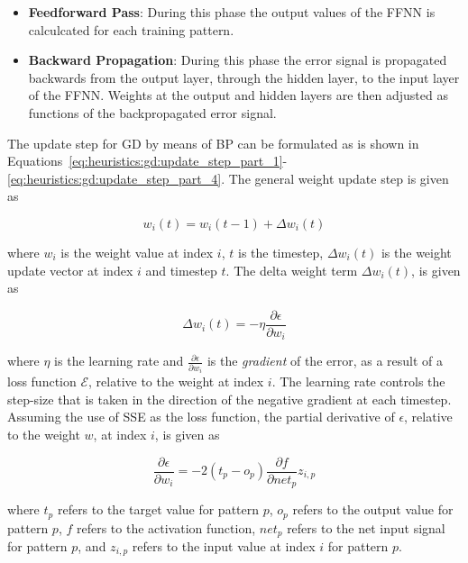 \begin{itemize}
      \item \textbf{Feedforward Pass}: During this phase the output values of the \acs{FFNN} is calculcated for each training pattern.

      \item \textbf{Backward Propagation}: During this phase the error signal is propagated backwards from the output layer, through the hidden layer, to the input layer of the \acs{FFNN}. Weights at the output and hidden layers are then adjusted as functions of the backpropagated error signal.
\end{itemize}

The update step for \acs{GD} by means of \acs{BP} can be formulated as is shown in Equations~\eqref{eq:heuristics:gd:update_step_part_1}-\eqref{eq:heuristics:gd:update_step_part_4}. The general weight update step is given as

\begin{equation}
      \label{eq:heuristics:gd:update_step_part_1}
      w_{i}(t) = w_{i}(t-1) + \Delta w_{i}(t)
\end{equation}

where $w_{i}$ is the weight value at index $i$, $t$ is the timestep, $\Delta w_{i}(t)$ is the weight update vector at index $i$ and timestep $t$. The delta weight term $\Delta w_{i}(t)$, is given as

\begin{equation}
      \label{eq:heuristics:gd:update_step_part_2}
      \Delta w_{i}(t) = -\eta\frac{\partial \epsilon}{\partial w_{i}}
\end{equation}

where $\eta$ is the learning rate and $\frac{\partial \epsilon}{\partial w_{i}}$ is the \textit{gradient} of the error, as a result of a loss function $\mathcal{E}$, relative to the weight at index $i$. The learning rate controls the step-size that is taken in the direction of the negative gradient at each timestep. Assuming the use of \acs{SSE} as the loss function, the partial derivative of $\epsilon$, relative to the weight $w$, at index $i$, is given as

\begin{equation}
      \label{eq:heuristics:gd:update_step_part_3}
      \frac{\partial \epsilon}{\partial w_{i}} = -2(t_{p} - o_{p})\frac{\partial f}{\partial net_{p}}z_{i,p}
\end{equation}

where $t_{p}$ refers to the target value for pattern $p$, $o_{p}$ refers to the output value for pattern $p$, $f$ refers to the activation function, $net_{p}$ refers to the net input signal for pattern $p$, and $z_{i,p}$ refers to the input value at index $i$ for pattern $p$.

